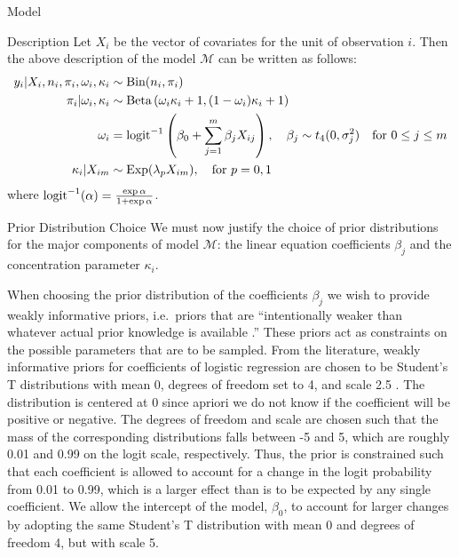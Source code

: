 \begin{chapter}{Model}
\begin{section}{Description}
  Let $X_i$ be the vector of covariates for the unit of observation $i$. Then
  the above description of the model $\mathcal{M}$ can be written as follows:
  \begin{align*}
    y_i | X_i, n_i, \pi_i, \omega_i, \kappa_i &\sim \text{Bin}(n_i, \pi_i) \\
    \pi_i | \omega_i, \kappa_i &\sim \text{Beta}\left(\omega_i \kappa_i + 1, (1 - \omega_i) \kappa_i + 1\right) \\
    \omega_i &= \operatorname{logit}^{-1}\left(\beta_0 + \sum_{j=1}^m  \beta_j X_{ij}\right), \quad \beta_j \sim t_4(0, \sigma_j^2) \quad \text{for $0 \leq j \leq m$}\\
    \kappa_i | X_{im} &\sim \text{Exp}(\lambda_p X_{im}), \quad \text{for $p = 0, 1$}
  \end{align*}
  where $\operatorname{logit}^{-1}(\alpha) = \frac{\exp{\alpha}}{1 + \exp{\alpha}}$.
\end{section}

\begin{section}{Prior Distribution Choice}
  We must now justify the choice of prior distributions for the major components of model $\mathcal{M}$:
  the linear equation coefficients $\beta_j$ and the concentration
  parameter $\kappa_i$.

  When choosing the prior distribution of the coefficients $\beta_j$ we wish to provide weakly informative
  priors, i.e.\ priors that are ``intentionally weaker than whatever actual prior knowledge is available \cite{bda3}.''
  These priors act as constraints on the possible parameters that are to be sampled. From the literature,
  weakly informative priors for coefficients of logistic regression are chosen to be Student's T distributions
  with mean 0, degrees of freedom set to 4, and scale 2.5 \cite{bda3}.
  The distribution is centered at 0 since apriori we do not
  know if the coefficient will be positive or negative. The degrees of
  freedom and scale are chosen such that the mass of the corresponding distributions falls between -5 and 5,
  which are roughly 0.01 and 0.99 on the logit scale, respectively.
  Thus, the prior is constrained such that each coefficient
  is allowed to account for a change in the logit probability from 0.01 to 0.99, which is a larger effect than is to be expected
  by any single coefficient. We allow the intercept of the model, $\beta_0$, to account for larger changes by adopting the same Student's T distribution
  with mean 0 and degrees of freedom 4, but with scale 5.


\end{section}
\end{chapter}
